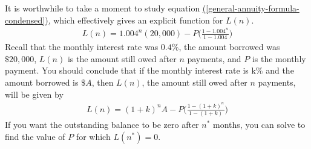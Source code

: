 \documentclass[10pt,]{book}
\theoremstyle{ptxdefinitionnotitle}
\theoremstyle{ptxdefinitiontitle}
\theoremstyle{ptxdefinitionnotitle}
\theoremstyle{ptxdefinitiontitle}
\theoremstyle{ptxdefinitionnotitle}
\theoremstyle{ptxdefinitiontitle}
\numberwithin{equation}{section}
\begin{document}
\begin{example}
It is worthwhile to take a moment to study equation \hyperref[general-annuity-formula-condensed]{(\ref{general-annuity-formula-condensed})}, which effectively gives an explicit function for \(L(n)\).%
%
\begin{gather*}
L(n) = 1.004^n (20,000) - P \bigg(\frac{1-1.004^n}{1-1.004}\bigg)
\end{gather*}
\hypertarget{p-171}{}%
Recall that the monthly interest rate was \(0.4\%\), the amount borrowed was \(\$20,000\),  \(L(n)\) is the amount still owed after \(n\) payments, and \(P\) is the monthly payment. You should conclude that if the monthly interest rate is k\% and the amount borrowed is \(\$A\), then \(L(n)\), the amount still owed after \(n\) payments, will be given by%
%
\begin{gather}
L(n) = (1+k)^n A - P \bigg(\frac{1-(1+k)^n}{1-(1+k)}\bigg)\label{mrow-100}
\end{gather}
\hypertarget{p-172}{}%
If you want the outstanding balance to be zero after \(n^*\) months, you can solve to find the value of \(P\) for which \(L(n^*)=0\).%
\end{example}
\typeout{************************************************}
\typeout{************************************************}
\end{document}
